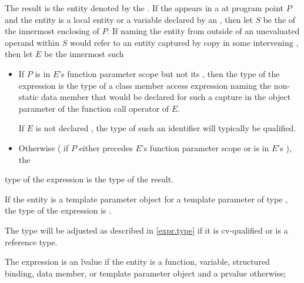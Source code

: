 \documentclass{wg21}
\begin{document}
\pnum
The result is the entity denoted by
the .
If the  appears
in a  at program point $P$ and
the entity is a local entity or a variable declared by
an ,
then let $S$ be the  of
the innermost enclosing  of $P$.
If naming the entity from outside of an unevaluated operand within $S$
would refer to an entity
captured by copy in some intervening ,
then let $E$ be the innermost such 
\begin{itemize}
    \item
    If  $P$ is in $E$'s function parameter scope
    but not its , then
    the type of the expression is
    the type of a class member access expression
    naming the non-static data member
    that would be declared for such a capture
    in the object parameter of the function call operator of $E$.
    \begin{note}
        If $E$ is not declared ,
        the type of such an identifier will typically be  qualified.
    \end{note}

    \item
    Otherwise ( if $P$ either precedes $E$'s function parameter scope or is in $E$'s ), the 
\end{itemize}
 type of the expression is the type of the result.
\begin{note}
    If the entity is a template parameter object for
    a template parameter of type ,
    the type of the expression is .
\end{note}
\begin{note}
    The type will be adjusted as described in \ref{expr.type}
    if it is cv-qualified or is a reference type.
\end{note}
The expression is an lvalue
if the entity is a function, variable, structured binding, data member, or
template parameter object
and a prvalue otherwise;
\end{document}
